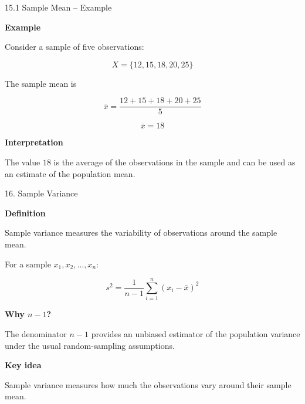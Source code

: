 
\begin{frame}{15.1 Sample Mean -- Example}

\textbf{Example}

Consider a sample of five observations:

\[
X=\{12,15,18,20,25\}
\]

The sample mean is

\[
\bar{x}
=
\frac{12+15+18+20+25}{5}
\]

\[
\boxed{
\bar{x}=18
}
\]

\vspace{0.4cm}

\textbf{Interpretation}

The value $18$ is the average of the observations in the
sample and can be used as an estimate of the population mean.

\end{frame}



\begin{frame}{16. Sample Variance}

\textbf{Definition}

Sample variance measures the variability of observations
around the sample mean.

\vspace{0.4cm}

For a sample $x_1,x_2,\ldots,x_n$:

\[
\boxed{
s^2
=
\frac{1}{n-1}
\sum_{i=1}^{n}
(x_i-\bar{x})^2
}
\]

\vspace{0.4cm}

\textbf{Why $n-1$?}

The denominator $n-1$ provides an unbiased estimator of the
population variance under the usual random-sampling assumptions.

\vspace{0.3cm}

\textbf{Key idea}

Sample variance measures how much the observations vary
around their sample mean.

\end{frame}


